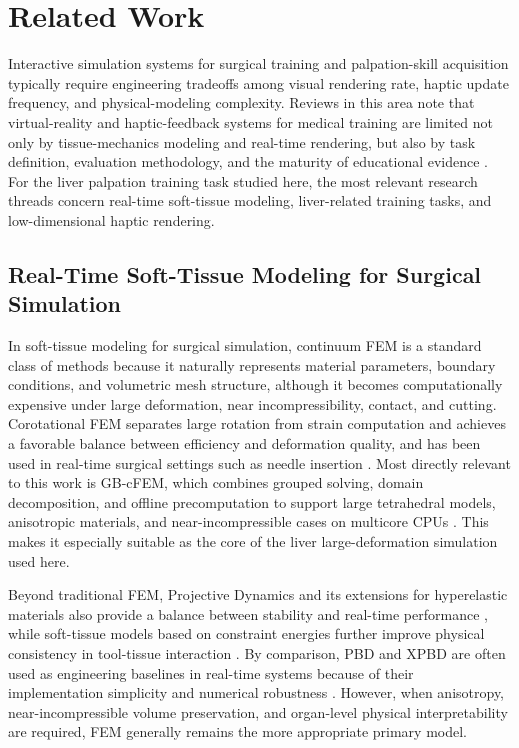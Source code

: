 \documentclass{ieeeaccess}
\begin{document}
\section{Related Work}
Interactive simulation systems for surgical training and palpation-skill acquisition typically require engineering tradeoffs among visual rendering rate, haptic update frequency, and physical-modeling complexity. Reviews in this area note that virtual-reality and haptic-feedback systems for medical training are limited not only by tissue-mechanics modeling and real-time rendering, but also by task definition, evaluation methodology, and the maturity of educational evidence \cite{overtoom2019haptic,rangarajan2020systematic,escobar2016review}. For the liver palpation training task studied here, the most relevant research threads concern real-time soft-tissue modeling, liver-related training tasks, and low-dimensional haptic rendering.

\subsection{Real-Time Soft-Tissue Modeling for Surgical Simulation}
In soft-tissue modeling for surgical simulation, continuum FEM is a standard class of methods because it naturally represents material parameters, boundary conditions, and volumetric mesh structure, although it becomes computationally expensive under large deformation, near incompressibility, contact, and cutting. Corotational FEM separates large rotation from strain computation and achieves a favorable balance between efficiency and deformation quality, and has been used in real-time surgical settings such as needle insertion \cite{bui2019corotational}. Most directly relevant to this work is GB-cFEM, which combines grouped solving, domain decomposition, and offline precomputation to support large tetrahedral models, anisotropic materials, and near-incompressible cases on multicore CPUs \cite{wang2025group}. This makes it especially suitable as the core of the liver large-deformation simulation used here.

Beyond traditional FEM, Projective Dynamics and its extensions for hyperelastic materials also provide a balance between stability and real-time performance \cite{bouaziz2023projective,liu2016towards}, while soft-tissue models based on constraint energies further improve physical consistency in tool-tissue interaction \cite{hou2019new}. By comparison, PBD and XPBD are often used as engineering baselines in real-time systems because of their implementation simplicity and numerical robustness \cite{bender2014survey,muller2007position,macklin2016xpbd}. However, when anisotropy, near-incompressible volume preservation, and organ-level physical interpretability are required, FEM generally remains the more appropriate primary model.
\end{document}

